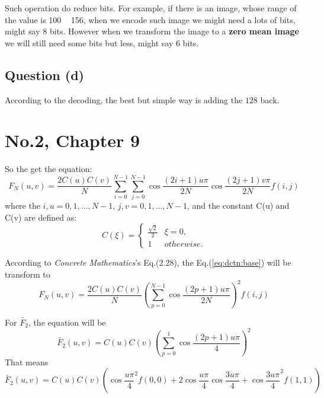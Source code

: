 \documentclass{article}
\def\vConcreteMathematics{\textit{Concrete Mathematics}}
\begin{document}
    Such operation do reduce bits. For example, if there is an image, whose range of
    the value is 100 ~ 156, when we encode such image we might need a lots of bits,
    might say 8 bits. However when we transform the image to a \textbf{zero mean image}
    we will still need some bits but less, might say 6 bits.
    
    \subsection{Question (d)}
    
    According to the decoding, the best but simple way is adding the $128$ back.
    
    \section{No.2, Chapter 9}
    
    So the get the equation:
    \begin{equation}
    \label{eq:dctn:base}
        F_N(u,v) =
            \frac{2C(u)C(v)}{N}
            \sum\limits_{i=0}^{N-1}\sum\limits_{j=0}^{N-1}
            \cos\frac{(2i+1)u\pi}{2N}\cos\frac{(2j+1)v\pi}{2N}
            f(i,j)
    \end{equation} 
    where the $i,u = 0,1,\dots,N-1$, $j,v = 0,1,\dots,N-1$, and the constant C(u) and C(v) are defined as:
    \begin{equation}
        C(\xi) = \left\{
        \begin{array}{cl}
        \frac{\sqrt{2}}{2} & \xi = 0, \\
        1 & otherwise.
        \end{array}
        \right.
    \end{equation}
    
    According to \vConcreteMathematics's Eq.(2.28), the Eq.(\ref{eq:dctn:base}) will
    be transform to
    \begin{equation}
        \label{eq:dctn:base2}
        F_N(u,v)=%
            \frac{2C(u)C(v)}{N}%
            \left(\sum\limits_{p=0}^{N-1}\cos\frac{(2p+1)u\pi}{2N}\right)^2%
            f(i,j)
    \end{equation}
    
    For $\widetilde{F_2}$, the equation will be
    $$
        \widetilde{F_2}(u,v) =
            C(u)C(v)
            \left(\sum\limits_{p=0}^{1}\cos\frac{(2p+1)u\pi}{4}\right)^2%
    $$
    That means
    \begin{equation}
        \label{eq:dctn:tt}
        \widetilde{F_2}(u,v) = 
            C(u)C(v)
            \left(
                \cos\frac{u\pi}{4}^2f(0,0)
              + 2\cos\frac{u\pi}{4}\cos\frac{3u\pi}{4}
              + \cos\frac{3u\pi}{4}^2f(1,1)
            \right)
    \end{equation}
    
\end{document}
